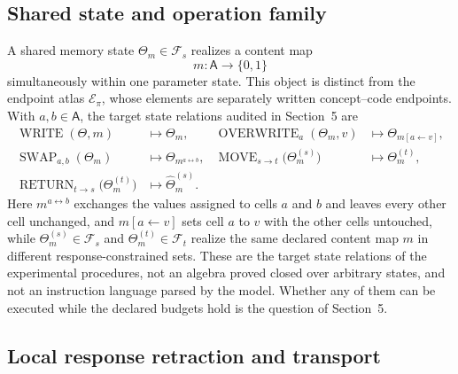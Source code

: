 \documentclass[11pt]{article}
\begin{document}
\subsection{Shared state and operation family}

A shared memory state $\Theta_m\in\mathcal{F}_s$ realizes a content map
\begin{equation}
m:\mathsf{A}\to\{0,1\}
\end{equation}
simultaneously within one parameter state. This object is distinct from the endpoint atlas $\mathcal{E}_\pi$,
whose elements are separately written concept--code endpoints. With $a,b\in\mathsf{A}$, the target state
relations audited in Section~5 are
\begin{align}
\operatorname{WRITE}(\Theta,m) &\mapsto \Theta_m, &
\operatorname{OVERWRITE}_a(\Theta_m,v) &\mapsto \Theta_{m[a\leftarrow v]},\\
\operatorname{SWAP}_{a,b}(\Theta_m) &\mapsto \Theta_{m^{a\leftrightarrow b}}, &
\operatorname{MOVE}_{s\to t}\bigl(\Theta^{(s)}_m\bigr) &\mapsto \Theta^{(t)}_m,\\
\operatorname{RETURN}_{t\to s}\bigl(\Theta^{(t)}_m\bigr) &\mapsto \widehat{\Theta}^{(s)}_m. & &
\end{align}
Here $m^{a\leftrightarrow b}$ exchanges the values assigned to cells $a$ and $b$ and leaves every other cell
unchanged, and $m[a\leftarrow v]$ sets cell $a$ to $v$ with the other cells untouched, while
$\Theta^{(s)}_m\in\mathcal{F}_s$ and $\Theta^{(t)}_m\in\mathcal{F}_t$ realize the same declared content map $m$
in different response-constrained sets. These are the target state relations of the experimental procedures,
not an algebra proved closed over arbitrary states, and not an instruction language parsed by the model.
Whether any of them can be executed while the declared budgets hold is the question of Section~5.

\subsection{Local response retraction and transport}
\end{document}
